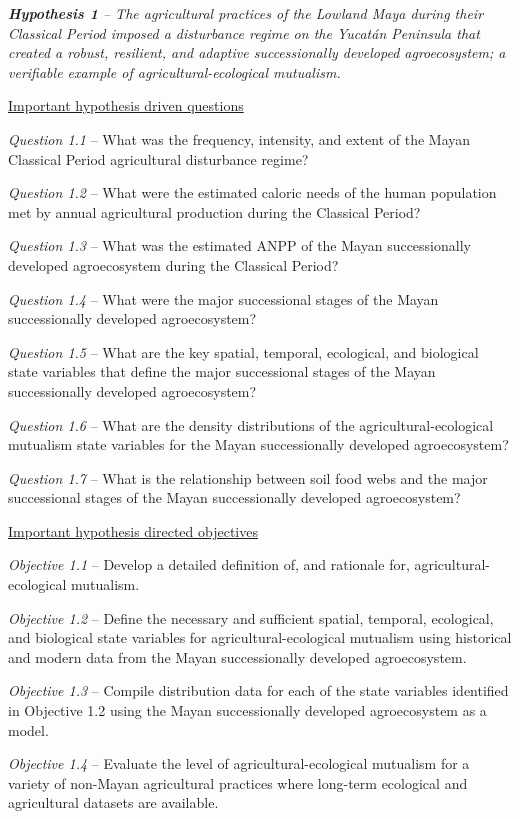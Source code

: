 \begin{description}
	\item{\textit{\textbf{Hypothesis 1} -- The agricultural practices of the Lowland Maya during their Classical Period imposed a disturbance regime on the Yucat\'{a}n Peninsula that created a robust, resilient, and adaptive successionally developed agroecosystem; a verifiable example of agricultural-ecological mutualism.}}
	
	\underline{Important hypothesis driven questions}
	\begin{description}
		\item{\textit{Question 1.1} -- What was the frequency, intensity, and extent of the Mayan Classical Period agricultural disturbance regime?}
		\item{\textit{Question 1.2} -- What were the estimated caloric needs of the human population met by annual agricultural production during the Classical Period?}
		\item{\textit{Question 1.3} -- What was the estimated ANPP of the Mayan successionally developed agroecosystem during the Classical Period?}
		\item{\textit{Question 1.4} -- What were the major successional stages of the Mayan successionally developed agroecosystem?}
		\item{\textit{Question 1.5} -- What are the key spatial, temporal, ecological, and biological state variables that define the major successional stages of the Mayan successionally developed agroecosystem?}
		\item{\textit{Question 1.6} --  What are the density distributions of the agricultural-ecological mutualism state variables for the Mayan successionally developed agroecosystem?}
		\item{\textit{Question 1.7} -- What is the relationship between soil food webs and the major successional stages of the Mayan successionally developed agroecosystem?}
	\end{description}
	
	\underline{Important hypothesis directed objectives}
	\begin{description}
	\item{\textit{Objective 1.1} -- Develop a detailed definition of, and rationale for, agricultural-ecological mutualism.}
	\item{\textit{Objective 1.2} -- Define the necessary and sufficient spatial, temporal, ecological, and biological state variables for agricultural-ecological mutualism using historical and modern data from the Mayan successionally developed agroecosystem.}
	\item{\textit{Objective 1.3} -- Compile distribution data for each of the state variables identified in Objective 1.2 using the Mayan successionally developed agroecosystem as a model.}
	\item{\textit{Objective 1.4} -- Evaluate the level of agricultural-ecological mutualism for a variety of non-Mayan agricultural practices where long-term ecological and agricultural datasets are available.}	
	\end{description}
	

\end{description}
